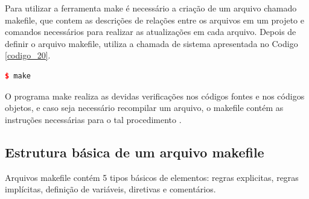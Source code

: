 Para utilizar a ferramenta make é necessário a criação de um arquivo chamado
 makefile, que contem as descrições de relações entre os arquivos em um projeto
 e comandos necessários para realizar as atualizações em cada arquivo\cite{Lasca2}.
 Depois de definir o arquivo makefile, utiliza a chamada de sistema apresentada 
no Codigo \ref{codigo_20}.

\begin{lstlisting}[language=C++,frame=single,captionpos=b,caption={
                             Chamada de Sistema para executar o programa make},
				                                                label=codigo_20]
    $ make
\end{lstlisting}


O programa make realiza as devidas verificações nos códigos fontes e
 nos códigos objetos, e caso seja necessário recompilar um arquivo, o
 makefile contém as instruções necessárias para o tal procedimento
 \cite{ref46}.


\subsection{Estrutura básica de um arquivo makefile}

Arquivos makefile contém 5 tipos básicos de elementos: regras explicitas,
 regras implícitas, definição de variáveis, diretivas e comentários.

